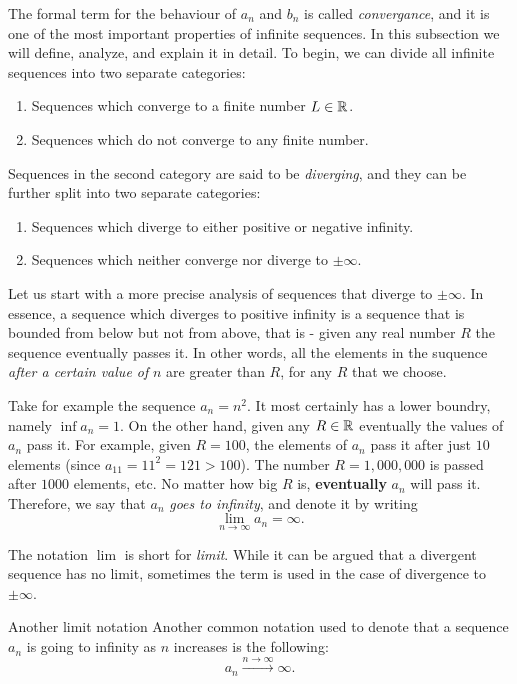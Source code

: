 The formal term for the behaviour of $a_{n}$ and $b_{n}$ is called \emph{convergance}, and it is one of the most important properties of infinite sequences. In this subsection we will define, analyze, and explain it in detail. To begin, we can divide all infinite sequences into two separate categories:
\begin{enumerate}
	\item Sequences which converge to a finite number $L\in\mathbb{R}^{}$.
	\item Sequences which do not converge to any finite number.
\end{enumerate}

Sequences in the second category are said to be \emph{diverging}, and they can be further split into two separate categories:
\begin{enumerate}[label=\roman*.]
	\item Sequences which diverge to either positive or negative infinity.
	\item Sequences which neither converge nor diverge to $\pm\infty$.
\end{enumerate}

Let us start with a more precise analysis of sequences that diverge to $\pm\infty$. In essence, a sequence which diverges to positive infinity is a sequence that is bounded from below but not from above, that is - given any real number $R$ the sequence eventually passes it. In other words, all the elements in the suquence \textit{after a certain value of} $n$ are greater than $R$, for any $R$ that we choose.

Take for example the sequence $a_{n}=n^{2}$. It most certainly has a lower boundry, namely $\inf a_{n}=1$. On the other hand, given any $R\in\mathbb{R}^{}$ eventually the values of $a_{n}$ pass it. For example, given $R=100$, the elements of $a_{n}$ pass it after just $10$ elements (since $a_{11}=11^{2}=121>100$). The number $R=1,000,000$ is passed after $1000$ elements, etc. No matter how big $R$ is, \textbf{eventually} $a_{n}$ will pass it. Therefore, we say that $a_{n}$ \textit{goes to infinity}, and denote it by writing
\begin{equation}
	\lim\limits_{n\to\infty}a_{n}=\infty.
	\label{eq:first_limit}
\end{equation}

The notation $\lim$ is short for \emph{limit}. While it can be argued that a divergent sequence has no limit, sometimes the term is used in the case of divergence to $\pm\infty$.

\begin{note}{Another limit notation}{}
	Another common notation used to denote that a sequence $a_{n}$ is going to infinity as $n$ increases is the following:
	\[
		a_{n} \xrightarrow[]{n\to\infty} \infty.
	\]
\end{note}

